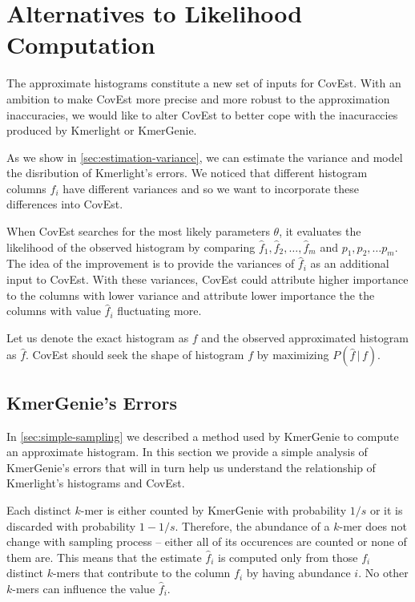 \section{Alternatives to Likelihood Computation}
The approximate histograms constitute a new set of inputs for CovEst.
With an ambition to make CovEst more precise and more robust to the approximation inaccuracies,
we would like to alter CovEst to better cope with the inacuraccies produced by
Kmerlight or KmerGenie.

As we show in \ref{sec:estimation-variance}, we can estimate the variance and 
model the disribution of Kmerlight's errors. We noticed that different histogram columns $f_i$
have different variances and so we want to incorporate these differences into CovEst.

When CovEst searches for the most likely parameters $\theta$, it evaluates the likelihood
of the observed histogram by comparing $\hat f_1, \hat f_2, \dots, \hat f_m$ and 
$p_1, p_2, \dots p_m$. The idea of the improvement is to provide the variances of 
$\hat f_i$ as an additional input to CovEst. With these variances, CovEst could
attribute higher importance to the columns with lower variance and attribute
lower importance the the columns with value $\hat f_i$ fluctuating more.

Let us denote the exact histogram as $f$ and the observed approximated histogram as $\hat f$.
CovEst should seek the shape of histogram $f$ by maximizing $P(\hat f \,|\, f)$. 

\subsection{KmerGenie's Errors}
\label{sec:kmergenie-errors}
In \ref{sec:simple-sampling} we described a method used by KmerGenie to compute 
an approximate histogram. In this section we provide a simple analysis of KmerGenie's
errors that will in turn help us understand the relationship of Kmerlight's histograms
and CovEst.

Each distinct $k$-mer is either counted by KmerGenie with probability $1/s$ or it is discarded 
with probability $1 - 1/s$. Therefore, the abundance of a $k$-mer does not change 
with sampling process -- either all of its occurences are counted or none of them are.
This means that the estimate $\hat f_i$ is computed only from those $f_i$ distinct $k$-mers 
that contribute to the column $f_i$ by having abundance $i$. No other $k$-mers can
influence the value $\hat f_i$.

